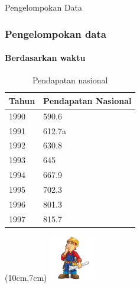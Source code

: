 \documentclass[main.tex]{subfiles}
\begin{document}
\begin{frame}[c]
	\huge Pengelompokan Data

\end{frame}
\begin{frame}[c]
	\frametitle{Pengelompokan data}
	\framesubtitle{Berdasarkan waktu}
	\begin{table}[htb]
		\caption{Pendapatan nasional}
		\begin{tabular}{ll}
			\hline
			Tahun  &  Pendapatan Nasional  \\
			\hline
			1990   &  590.6  \\
			1991   &  612.7a  \\
			1992   &  630.8  \\
			1993   &  645  \\
			1994   &  667.9  \\
			1995   &  702.3  \\
			1996   &  801.3  \\
			1997   &  815.7  \\
			\hline
		\end{tabular}
	\end{table}
	\begin{textblock*}{2cm}(10cm,7cm) %
		\includegraphics[width=2cm]{figures/cons}
	\end{textblock*}

\end{frame}
\end{document}
